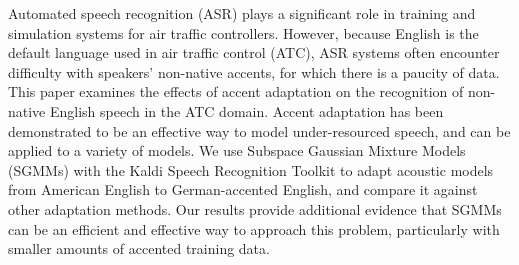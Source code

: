 Automated speech recognition (ASR) plays a significant role in training and simulation systems for air traffic controllers. However, because English is the default language used in air traffic control (ATC), ASR systems often encounter difficulty with speakers' non-native accents, for which there is a paucity of data. This paper examines the effects of accent adaptation on the recognition of non-native English speech in the ATC domain. Accent adaptation has been demonstrated to be an effective way to model under-resourced speech, and can be applied to a variety of models. We use Subspace Gaussian Mixture Models (SGMMs) with the Kaldi Speech Recognition Toolkit to adapt acoustic models from American English to German-accented English, and compare it against other adaptation methods. Our results provide additional evidence that SGMMs can be an efficient and effective way to approach this problem, particularly with smaller amounts of accented training data.
